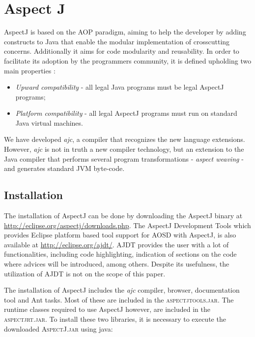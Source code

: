 \documentclass{template}
\begin{document}
\section{Aspect J}

AspectJ is based on the AOP paradigm, aiming to help the developer by adding constructs to Java that enable the modular implementation of crosscutting concerns. Additionally it aims for code modularity and reusability.
In order to facilitate its adoption by the programmers community, it is defined upholding two main properties \cite{Kiczales97aspect-orientedprogramming}:

\begin{itemize}
\item \textit{Upward compatibility} - all legal Java programs must be legal AspectJ programs;
\item \textit{Platform compatibility} - all legal AspectJ programs must run on standard Java virtual machines. 
\end{itemize}

We have developed \textit{ajc}, a compiler that recognizes the new language extensions.
However, \textit{ajc} is not in truth a new compiler technology, but an extension to the Java compiler
that performs several program transformations - \emph{aspect weaving} - and generates standard JVM byte-code.

\subsection{Installation}

The installation of AspectJ can be done by downloading the AspectJ binary at \url{http://eclipse.org/aspectj/downloads.php}. 
The AspectJ Development Tools which provides Eclipse platform based tool support for AOSD with AspectJ, is also available at \url{http://eclipse.org/ajdt/}. AJDT provides the user with a lot of functionalities, including code highlighting, indication of sections on the code where advices will be introduced, among others. Despite its usefulness, the utilization of AJDT is not on the scope of this paper.

The installation of AspectJ includes the \textit{ajc} compiler, browser, documentation tool and Ant tasks. Most of these are included in the \textsc{aspectjtools.jar}. The runtime classes required to use AspectJ however, are included in the \textsc{aspectjrt.jar}. To install these two libraries, it is necessary to execute the downloaded \textsc{AspectJ.jar} using java:
\end{document}
